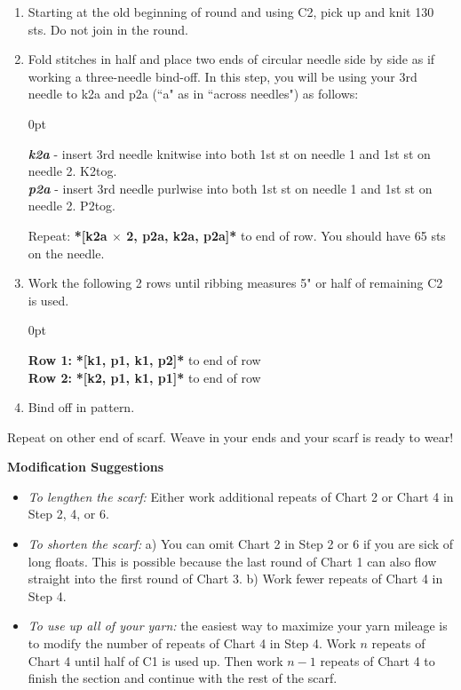 \documentclass[12pt]{article}
\newcommand{\vocab}[1]{\emph{\textbf{#1}}} %
\newcommand{\rowDir}[1]{\textbf{#1:}} %
\renewcommand{\repeat}[1]{\textbf{*[#1]*}} %
\newenvironment{frnote}
    {%
    	\setlength{\FrameRule}{1.5pt}
    	\def\FrameCommand{\fboxrule=\FrameRule\fboxsep=\FrameSep \fcolorbox{framecolor}{shadecolor}}
    	\MakeFramed {\FrameRestore}}
    {\setlength{\FrameRule}{1pt}
	\endMakeFramed}
\newenvironment{unframed}
    {%
	\begin{addmargin}[2em]{0pt}
	}
    {
	\setlength{\parindent}{0em}
	\end{addmargin}}
\begin{document}
\begin{enumerate}[itemsep=0mm]
\item Starting at the old beginning of round and using C2, pick up and knit 130 sts. Do not join in the round. 
\item Fold stitches in half and place two ends of circular needle side by side as if working a three-needle bind-off. In this step, you will be using your 3rd needle to k2a and p2a (``a" as in ``across needles") as follows:
\begin{unframed}
\small
\vocab{k2a} - insert 3rd needle knitwise into both 1st st on needle 1 and 1st st on needle 2. K2tog. \\
\vocab{p2a} - insert 3rd needle purlwise into both 1st st on needle 1 and 1st st on needle 2. P2tog.
\end{unframed}

Repeat: \repeat{k2a $\times$ 2, p2a, k2a, p2a} to end of row. You should have 65 sts on the needle.
\item Work the following 2 rows until ribbing measures 5" or half of remaining C2 is used. 
\begin{unframed}
\rowDir{Row 1} \repeat{k1, p1, k1, p2} to end of row \\
\rowDir{Row 2} \repeat{k2, p1, k1, p1} to end of row
\end{unframed}

\item Bind off in pattern.
\end{enumerate}

Repeat on other end of scarf. Weave in your ends and your scarf is ready to wear!

\newpage

\begin{frnote}
\textbf{Modification Suggestions} 
\begin{itemize}
\item \emph{To lengthen the scarf:} Either work additional repeats of Chart 2 or Chart 4 in Step 2, 4, or 6.
\item \emph{To shorten the scarf:} a) You can omit Chart 2 in Step 2 or 6 if you are sick of long floats. This is possible because the last round of Chart 1 can also flow straight into the first round of Chart 3. b) Work fewer repeats of Chart 4 in Step 4.
\item \emph{To use up all of your yarn:} the easiest way to maximize your yarn mileage is to modify the number of repeats of Chart 4 in Step 4. Work $n$ repeats of Chart 4 until half of C1 is used up. Then work $n-1$ repeats of Chart 4 to finish the section and continue with the rest of the scarf.
\end{itemize}
\end{frnote}
\end{document}
